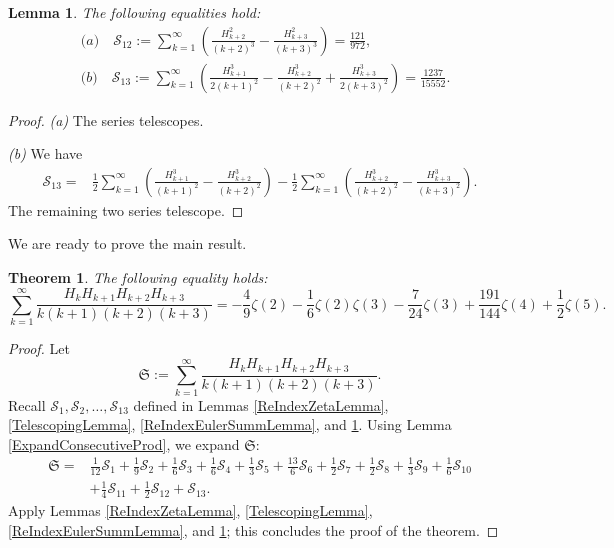 \documentclass[10pt]{amsart}
\newtheorem{theorem}{Theorem}
\newtheorem{lemma}{Lemma}
\theoremstyle{definition}
\begin{document}
\begin{lemma} \label{PowerEulerSumLemma}
    The following equalities hold:
    \begin{align*}
        &\textit{(a)}\quad \mathcal{S}_{12} := \sum_{k=1}^\infty \left(\frac{H_{k+2}^2}{(k+2)^3} - \frac{H_{k+3}^2}{(k+3)^3}\right) = \frac{121}{972},\\
        &\textit{(b)}\quad \mathcal{S}_{13} := \sum_{k=1}^\infty \left(\frac{H_{k+1}^3}{2 (k+1)^2} - \frac{H_{k+2}^3}{(k+2)^2} + \frac{H_{k+3}^3}{2 (k+3)^2}\right) = \frac{1237}{15552}.
    \end{align*}
\end{lemma}
\begin{proof}
    \textit{(a)} The series telescopes.

    \noindent
    \textit{(b)} We have
    \begin{align*}
        \mathcal{S}_{13}
        =& \frac{1}{2}\sum_{k=1}^\infty \left(\frac{H_{k+1}^3}{(k+1)^2} - \frac{H_{k+2}^3}{(k+2)^2}\right) -\frac{1}{2}\sum_{k=1}^\infty \left( \frac{H_{k+2}^3}{(k+2)^2} - \frac{H_{k+3}^3}{(k+3)^2}\right).
    \end{align*}
    The remaining two series telescope.
\end{proof}

We are ready to prove the main result.
\begin{theorem} \label{MainProposition}
    The following equality holds:
    $$\sum_{k=1}^\infty \frac{H_k H_{k+1} H_{k+2} H_{k+3}}{k(k+1)(k+2)(k+3)} = -\frac{4}{9} \zeta (2)-\frac{1}{6}\zeta (2) \zeta (3)-\frac{7}{24} \zeta (3)+\frac{191}{144} \zeta (4)+\frac{1}{2}\zeta (5).$$
\end{theorem}
\begin{proof}
    Let
    $$\mathfrak{S} := \sum_{k=1}^\infty \frac{H_k H_{k+1} H_{k+2} H_{k+3}}{k(k+1)(k+2)(k+3)}.$$
    Recall $\mathcal{S}_1, \mathcal{S}_2, \ldots, \mathcal{S}_{13}$ defined in Lemmas \ref{ReIndexZetaLemma}, \ref{TelescopingLemma}, \ref{ReIndexEulerSummLemma}, and \ref{PowerEulerSumLemma}. Using Lemma \ref{ExpandConsecutiveProd}, we expand $\mathfrak{S}$:
    \begin{align*}
        \mathfrak{S}
        =& \frac{1}{12}\mathcal{S}_1 + \frac{1}{9}\mathcal{S}_2 + \frac{1}{6}\mathcal{S}_3 + \frac{1}{6}\mathcal{S}_4 + \frac{1}{3}\mathcal{S}_5 + \frac{13}{6}\mathcal{S}_6 + \frac{1}{2}\mathcal{S}_7 + \frac{1}{2}\mathcal{S}_8 + \frac{1}{3}\mathcal{S}_9 + \frac{1}{6}\mathcal{S}_{10}\\
        &+ \frac{1}{4}\mathcal{S}_{11} + \frac{1}{2}\mathcal{S}_{12} + \mathcal{S}_{13}.
    \end{align*}
    Apply Lemmas \ref{ReIndexZetaLemma}, \ref{TelescopingLemma}, \ref{ReIndexEulerSummLemma}, and \ref{PowerEulerSumLemma}; this concludes the proof of the theorem.
\end{proof}
\end{document}
